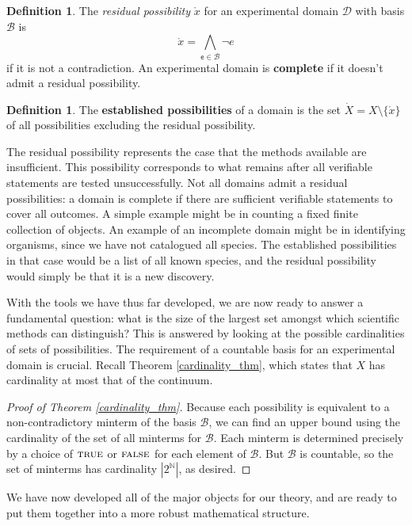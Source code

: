 \documentclass[psamsfonts]{amsart}
\theoremstyle{definition}
\newtheorem{defn}[thm]{Definition}
\theoremstyle{remark}
\numberwithin{equation}{section}
\newcommand{\N}{\mathbb{N}}
\def\TRUE{\textsc{true}}
\def\FALSE{\textsc{false}}
\def\bigAND{\bigwedge}
\def\NOT{\neg}
\newcommand{\stmt}[1][s] {\mathsf{#1}}
\newcommand{\edomain}[1][D] {\mathcal{#1}}
\newcommand{\basis}[1][B] {\mathcal{#1}} %
\begin{document}
	\begin{defn}
		The \emph{residual possibility} $\mathring{x}$ for an experimental domain $\edomain$ with basis $\basis$ is $$\mathring{x} = \bigAND\limits_{\stmt[e] \in \basis} \NOT e$$ if it is not a contradiction. An experimental domain is \textbf{complete} if it doesn't admit a residual possibility.
	\end{defn}

	\begin{defn}
	The \textbf{established possibilities} of a domain is the set $\dot{X}=X\setminus\{\mathring{x}\}$ of all possibilities excluding the residual possibility.
\end{defn}

The residual possibility represents the case that the methods available are insufficient. This possibility corresponds to what remains after all verifiable statements are tested unsuccessfully. Not all domains admit a residual possibilities: a domain is complete if there are sufficient verifiable statements to cover all outcomes. A simple example might be in counting a fixed finite collection of objects. An example of an incomplete domain might be in identifying organisms, since we have not catalogued all species. The established possibilities in that case would be a list of all known species, and the residual possibility would simply be that it is a new discovery. 

With the tools we have thus far developed, we are now ready to answer a fundamental question: what is the size of the largest set amongst which scientific methods can distinguish? This is answered by looking at the possible cardinalities of sets of possibilities. The requirement of a countable basis for an experimental domain is crucial. Recall Theorem \ref{cardinality_thm}, which states that $X$ has cardinality at most that of the continuum. 


\begin{proof}[Proof of Theorem \ref{cardinality_thm}]
Because each possibility is equivalent to a non-contradictory minterm of the basis $\basis$, we can find an upper bound using the cardinality of the set of all minterms for $\basis$. Each minterm is determined precisely by a choice of $\TRUE$ or $\FALSE$ for each element of $\basis$. But $\basis$ is countable, so the set of minterms has cardinality $|2^{\N}|$, as desired.
\end{proof}

We have now developed all of the major objects for our theory, and are ready to put them together into a more robust mathematical structure. 
\end{document}
